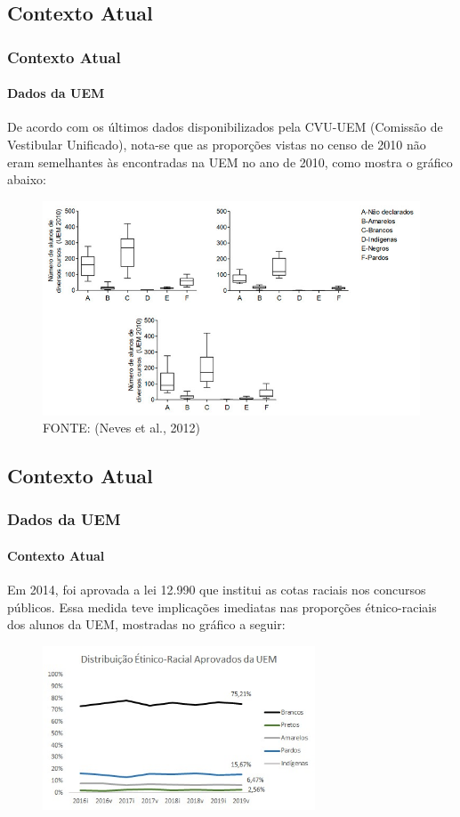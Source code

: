 \documentclass{beamer}
\begin{document}
\subsection{Contexto Atual}

\begin{frame}
    \frametitle{Contexto Atual}
    \framesubtitle{Dados da UEM}
    \justifying
   De acordo com os últimos dados disponibilizados pela CVU-UEM (Comissão de Vestibular Unificado), nota-se que as proporções vistas no censo de 2010 não eram semelhantes às encontradas na UEM no ano de 2010, como mostra o gráfico abaixo:
   \begin{figure}
       \centering
       \includegraphics[width=7.1cm\textwidth]{grafico04.jpeg}
       \caption*{FONTE: (Neves et al., 2012)\small}
   \end{figure}
    
\end{frame}

\subsection{Contexto Atual}

\begin{frame}
    \frametitle{Dados da UEM}
    \framesubtitle{Contexto Atual}
    \justifying
   Em 2014, foi aprovada a lei 12.990 que institui as cotas raciais nos concursos públicos. Essa medida teve implicações imediatas nas proporções étnico-raciais dos alunos da UEM, mostradas no gráfico a seguir:
    \begin{figure}
       \centering
       \includegraphics[width=8.1cm]{grafico-linhas-cotas.jpeg}
   \end{figure}
   
\end{frame}
\end{document}
